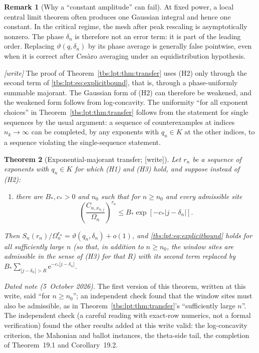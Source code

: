 \documentclass[11pt,a4paper]{article}
\numberwithin{equation}{section}
\newtheorem{theorem}{Theorem}[section]
\theoremstyle{definition}
\newtheorem{remark}[theorem]{Remark}
\newcommand{\ee}{\mathrm e}
\begin{document}
\begin{remark}[Why a ``constant amplitude'' can fail]\label{tbs:lpt:rem:constant}
At fixed power, a local central limit theorem often produces one Gaussian
integral and hence one constant. In the critical regime, the mesh after
peak rescaling is asymptotically nonzero. The phase $\delta_n$ is
therefore not an error term: it is part of the leading order. Replacing
$\vartheta(q,\delta_n)$ by its phase average is generally false pointwise,
even when it is correct after Ces\`aro averaging under an
equidistribution hypothesis.
\end{remark}

\emph{[write]} The proof of Theorem~\ref{tbs:lpt:thm:transfer} uses (H2)
only through the second term of \eqref{tbs:lpt:eq:explicitbound}, that is,
through a phase-uniformly summable majorant. The Gaussian form of (H2)
can therefore be weakened, and the weakened form follows from
log-concavity. The uniformity ``for all exponent choices'' in
Theorem~\ref{tbs:lpt:thm:transfer} follows from the statement for single
sequences by the usual argument: a sequence of counterexamples at
indices $n_k\to\infty$ can be completed, by any exponents with $q_n\in K$
at the other indices, to a sequence violating the single-sequence
statement.

\begin{theorem}[Exponential-majorant transfer; {[write]}]\label{tbs:lpt:thm:exp-majorant}
Let $r_n$ be a sequence of exponents with $q_n\in K$ for which (H1) and
(H3) hold, and suppose instead of (H2):
\begin{enumerate}[label=\textup{(H2e)}]
\item there are $B_*,c_*>0$ and $n_0$ such that for $n\ge n_0$ and every
 admissible site
 \begin{equation}\label{tbs:lpt:eq:expdom}
 \left(\frac{C_{n,x_{n,j}}}{\Omega_n}\right)^{r_n}
 \le B_*\exp[-c_*|j-\delta_n|].
 \end{equation}
\end{enumerate}
Then $S_n(r_n)/\Omega_n^{r_n}=\vartheta(q_n,\delta_n)+o(1)$, and
\eqref{tbs:lpt:eq:explicitbound} holds for all sufficiently large $n$ (so
that, in addition to $n\ge n_0$, the window sites are admissible in the sense
of (H3) for that $R$) with its second term
replaced by $B_*\sum_{|j-\delta_n|>R}\ee^{-c_*|j-\delta_n|}$.
\end{theorem}
\noindent\emph{Dated note (5~October 2026).} The first version of this
theorem, written at this write, said ``for $n\ge n_0$''; an independent
check found that the window sites must also be admissible, as in
Theorem~\ref{tbs:lpt:thm:transfer}'s ``sufficiently large $n$''. The
independent check (a careful reading with exact-row numerics, not a formal
verification) found the other results added at this write valid:
the log-concavity criterion, the Mahonian and ballot instances, the
theta-side tail, the completion of Theorem~19.1 and Corollary~19.2.
\end{document}
